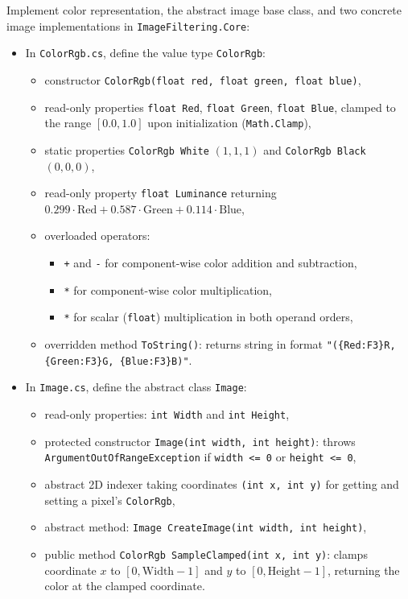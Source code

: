 \documentclass[11pt,a4paper,addpoints]{exam}
\begin{document}
\begin{questions}

\question[4]
Implement color representation, the abstract image base class, and two concrete image implementations in \texttt{ImageFiltering.Core}:
\begin{itemize}
    \item In \texttt{ColorRgb.cs}, define the value type \texttt{ColorRgb}:
    \begin{itemize}
        \item constructor \texttt{ColorRgb(float red, float green, float blue)},
        \item read-only properties \texttt{float Red}, \texttt{float Green}, \texttt{float Blue}, clamped to the range $[0.0, 1.0]$ upon initialization (\texttt{Math.Clamp}),
        \item static properties \texttt{ColorRgb White} $(1, 1, 1)$ and \texttt{ColorRgb Black} $(0, 0, 0)$,
        \item read-only property \texttt{float Luminance} returning $0.299 \cdot \text{Red} + 0.587 \cdot \text{Green} + 0.114 \cdot \text{Blue}$,
        \item overloaded operators:
        \begin{itemize}
            \item \texttt{+} and \texttt{-} for component-wise color addition and subtraction,
            \item \texttt{*} for component-wise color multiplication,
            \item \texttt{*} for scalar (\texttt{float}) multiplication in both operand orders,
        \end{itemize}
        \item overridden method \texttt{ToString()}: returns string in format \texttt{"(\{Red:F3\}R, \{Green:F3\}G, \{Blue:F3\}B)"}.
    \end{itemize}

    \item In \texttt{Image.cs}, define the abstract class \texttt{Image}:
    \begin{itemize}
        \item read-only properties: \texttt{int Width} and \texttt{int Height},
        \item protected constructor \texttt{Image(int width, int height)}: throws \texttt{ArgumentOutOfRangeException} if \texttt{width <= 0} or \texttt{height <= 0},
        \item abstract 2D indexer taking coordinates \texttt{(int x, int y)} for getting and setting a pixel's \texttt{ColorRgb},
        \item abstract method: \texttt{Image CreateImage(int width, int height)},
        \item public method \texttt{ColorRgb SampleClamped(int x, int y)}: clamps coordinate $x$ to $[0, \text{Width}-1]$ and $y$ to $[0, \text{Height}-1]$, returning the color at the clamped coordinate.
    \end{itemize}


\end{itemize}
\end{questions}
\end{document}
